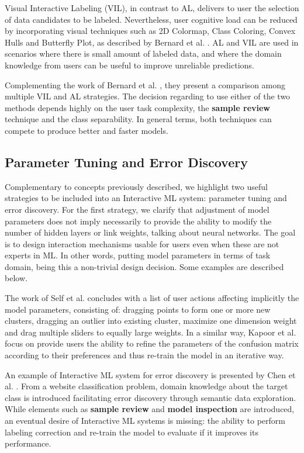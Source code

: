 Visual Interactive Labeling (VIL), in contrast to AL, delivers to user the selection of data candidates to be labeled. Nevertheless, user cognitive load can be reduced by incorporating visual techniques such as 2D Colormap, Class Coloring, Convex Hulls and Butterfly Plot, as described by Bernard et al. \cite{Bernard2018b}. AL and VIL are used in scenarios where there is small amount of labeled data, and where the domain knowledge from users can be useful to improve unreliable predictions. 

Complementing the work of Bernard et al. \cite{Bernard2018b}, they present a comparison among multiple VIL and AL strategies. The decision regarding to use either of the two methods depends highly on the user task complexity, the \textbf{sample review} technique and the class separability. In general terms, both techniques can compete to produce better and faster models.

\subsection{Parameter Tuning and Error Discovery}
\label{subsec:param-error}

Complementary to concepts previously described, we highlight two useful strategies to be included into an Interactive ML system: parameter tuning and error discovery. For the first strategy, we clarify that adjustment of model parameters does not imply necessarily to provide the ability to modify the number of hidden layers or link weights, talking about neural networks. The goal is to design interaction mechanisms usable for users even when these are not experts in ML. In other words, putting model parameters in terms of task domain, being this a non-trivial design decision. Some examples are described below.   

The work of Self et al. \cite{Self2016BridgingAnalytics} concludes with a list of user actions affecting implicitly the model parameters, consisting of: dragging points to form one or more new clusters, dragging an outlier into existing cluster, maximize one dimension weight and drag multiple sliders to equally large weights. In a similar way, Kapoor et al. \cite{Kapoor2010InteractiveClassification} focus on provide users the ability to refine the parameters of the confusion matrix according to their preferences and thus re-train the model in an iterative way.

An example of Interactive ML system for error discovery is presented by Chen et al. \cite{Chen2018b}. From a website classification problem, domain knowledge about the target class is introduced facilitating error discovery through semantic data exploration. While elements such as \textbf{sample review} and \textbf{model inspection} are introduced, an eventual desire of Interactive ML systems is missing: the ability to perform labeling correction and re-train the model to evaluate if it improves its performance.

